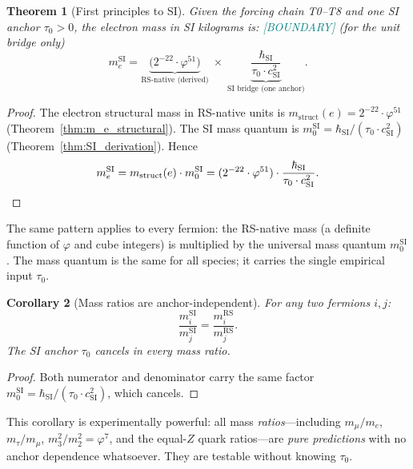 \documentclass[11pt,a4paper]{article}
\newtheorem{theorem}{Theorem}[section]
\newtheorem{corollary}[theorem]{Corollary}
\theoremstyle{definition}
\theoremstyle{remark}
\newcommand{\phig}{\varphi}
\newcommand{\Zidx}{Z}
\newcommand{\BOUNDARY}{\textcolor{teal}{\footnotesize\textsf{[BOUNDARY]}}}
\begin{document}
\begin{theorem}[First principles to SI]
\label{thm:first_principles_to_SI}
Given the forcing chain T0--T8 and one SI anchor $\tau_0 > 0$, the electron
mass in SI kilograms is: \BOUNDARY{} (for the unit bridge only)
\begin{equation}
  \boxed{m_e^{\mathrm{SI}}
  = \underbrace{\bigl(2^{-22} \cdot \phig^{51}\bigr)}_{\text{RS-native (derived)}}
  \;\times\;
  \underbrace{\frac{\hbar_{\mathrm{SI}}}
    {\tau_0 \cdot c_{\mathrm{SI}}^2}}_{\text{SI bridge (one anchor)}}.}
  \label{eq:m_e_SI}
\end{equation}
\end{theorem}

\begin{proof}
The electron structural mass in RS-native units is $m_{\mathrm{struct}}(e) =
2^{-22} \cdot \phig^{51}$ (Theorem~\ref{thm:m_e_structural}).
The SI mass quantum is $m_0^{\mathrm{SI}} = \hbar_{\mathrm{SI}} /
(\tau_0 \cdot c_{\mathrm{SI}}^2)$ (Theorem~\ref{thm:SI_derivation}).
Hence
\[
  m_e^{\mathrm{SI}}
  = m_{\mathrm{struct}}(e) \cdot m_0^{\mathrm{SI}}
  = (2^{-22} \cdot \phig^{51}) \cdot
    \frac{\hbar_{\mathrm{SI}}}{\tau_0 \cdot c_{\mathrm{SI}}^2}. \qedhere
\]
\end{proof}

\noindent
The same pattern applies to every fermion: the RS-native mass (a definite
function of $\phig$ and cube integers) is multiplied by the universal mass
quantum $m_0^{\mathrm{SI}}$.  The mass quantum is the same for all species;
it carries the single empirical input $\tau_0$.

\begin{corollary}[Mass ratios are anchor-independent]
\label{cor:ratios_anchor_free}
For any two fermions $i, j$:
\begin{equation}
  \frac{m_i^{\mathrm{SI}}}{m_j^{\mathrm{SI}}}
  = \frac{m_i^{\mathrm{RS}}}{m_j^{\mathrm{RS}}}.
  \label{eq:ratio_anchor_free}
\end{equation}
The SI anchor $\tau_0$ cancels in every mass ratio.
\end{corollary}

\begin{proof}
Both numerator and denominator carry the same factor
$m_0^{\mathrm{SI}} = \hbar_{\mathrm{SI}} / (\tau_0 \cdot c_{\mathrm{SI}}^2)$,
which cancels.
\end{proof}

\noindent
This corollary is experimentally powerful: all mass \emph{ratios}---including
$m_\mu/m_e$, $m_\tau/m_\mu$, $m_3^2/m_2^2 = \phig^7$, and the
equal-$\Zidx$ quark ratios---are \emph{pure predictions} with no anchor
dependence whatsoever.  They are testable without knowing $\tau_0$.
\end{document}
